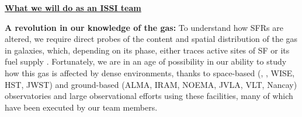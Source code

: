 \documentclass[11pt]{article}
\begin{document}

\centerline{{\bf \underline{ What we will do as an ISSI team}}}

\textbf{A revolution in our knowledge of the gas:} To understand how SFRs are altered, we require direct probes of the content and spatial distribution of the gas in galaxies, which, depending on its phase, either traces active sites of SF or its fuel supply  \citep[e.g.][]{Kennicutt98b,Bigiel08,Leroy08}.  Fortunately, we are in an age of possibility in our ability to study how this gas is affected by dense environments, thanks to space-based (\spitzer, \herschel, WISE, HST, JWST) and ground-based (ALMA, IRAM, NOEMA, JVLA, VLT, Nancay) observatories and large observational efforts using these facilities, many of which have been executed by our team members.
\end{document}
